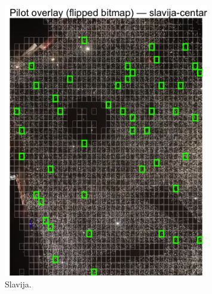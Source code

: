 \documentclass[a4paper,12pt]{article}
\begin{document}
\begin{figure}[H] 
	\centering 
	\includegraphics[width=0.8\textwidth]{../outputs/sampling_outputs/plot_overlays_image/pilot_overlay_slavija-centar.png} 
	\caption{Slavija.} 
	\label{fig:slavija} 
\end{figure}
\end{document}
